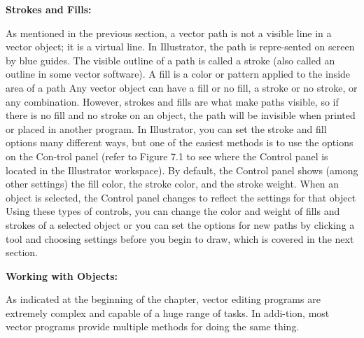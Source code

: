 \documentclass{report}
\begin{document}
    \bigbreak \noindent \bigbreak \noindent 
    \begin{large}
      \textbf{Strokes and Fills:}
    \end{large}
    \bigbreak \noindent 
    As mentioned in the previous section, a vector path is not a visible line in a vector object; it is a virtual line. In Illustrator, the path is repre-sented on screen by blue guides. The visible outline of a path is called a stroke (also called an outline in some vector software).
    \bigbreak \noindent 
    A fill is a color or pattern applied to the inside area of a path
    \bigbreak \noindent 
    Any vector object can have a fill or no fill, a stroke or no stroke, or any combination. However, strokes and fills are what make paths visible, so if there is no fill and no stroke on an object, the path will be invisible when printed or placed in another program.
    \bigbreak \noindent 
    In Illustrator, you can set the stroke and fill options many different ways, but one of the easiest methods is to use the options on the Con-trol panel (refer to Figure 7.1 to see where the Control panel is located in the Illustrator workspace). By default, the Control panel shows (among other settings) the fill color, the stroke color, and the stroke weight. When an object is selected, the Control panel changes to reflect the settings for that object
    \bigbreak \noindent 
    Using these types of controls, you can change the color and weight of fills and strokes of a selected object or you can set the options for new paths by clicking a tool and choosing settings before you begin to draw, which is covered in the next section.

    \bigbreak \noindent \bigbreak \noindent 
    \begin{Large}
      \textbf{Working with Objects:}
    \end{Large}
    \bigbreak \noindent 
    As indicated at the beginning of the chapter, vector editing programs are extremely complex and capable of a huge range of tasks. In addi-tion, most vector programs provide multiple methods for doing the same thing.
\end{document}

